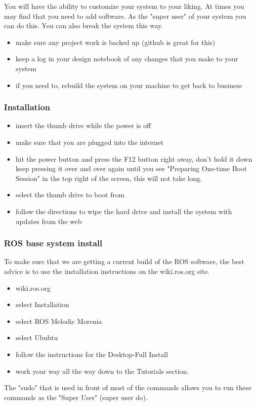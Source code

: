 \documentclass[12pt,letterpaper]{beamer}
\begin{document}
\begin{frame}
	You will have the ability to customize your system to your liking. At times you may find that you need to add software. As the "super user" of your system you can do this. You can also break the system this way. 
	\begin{itemize}
		\item<2-> make sure any project work is backed up (github is great for this)
		\item<3-> keep a log in your design notebook of any changes that you make to your system
		\item<4-> if you need to, rebuild the system on your machine to get back to business
	\end{itemize}
\end{frame}

\begin{frame}
	\frametitle{Installation}
	\begin{itemize}
		\item insert the thumb drive while the power is off
		\item make sure that you are plugged into the internet
		\item hit the power button and press the F12 button right away, don't hold it down keep pressing it over and over again until you see "Preparing One-time Boot Session" in the top right of the screen, this will not take long.
		\item select the thumb drive to boot from
		\item follow the directions to wipe the hard drive and install the system with updates from the web
	\end{itemize}
\end{frame}


\begin{frame}
	\frametitle{ROS base system install}
	To make sure that we are getting a current build of the ROS software, the best advice is to use the installation instructions on the wiki.ros.org site.
	\begin{itemize}
		\item wiki.ros.org
		\item select Installation
		\item select ROS Melodic Morenia
		\item select Ububtu
		\item follow the instructions for the Desktop-Full Install
		\item work your way all the way down to the Tutorials section.
	\end{itemize}
	The "sudo" that is used in front of most of the commands allows you to run these commands as the "Super User" (super user do).
\end{frame}
\end{document}

